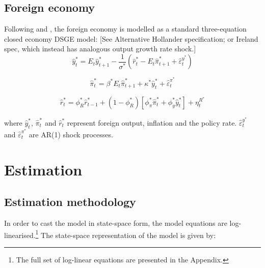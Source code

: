 \documentclass[a4paper,11pt]{article}
\numberwithin{equation}{section}
\begin{document}
%	
	
	
	\subsection{Foreign economy}
	
	Following \cite{steinbach2014} and , the foreign economy is modelled as a standard three-equation closed economy DSGE model:
	{[\color{red}See Alternative Hollander specification; or Ireland spec, which instead has analogous output growth rate shock.]}
	\begin{equation}
	\hat{y}_t^*=E_t\hat{y}_{t+1}^*-\frac{1}{\sigma^*}\left(\hat{r}_t^*-E_t\hat{\pi}_{t+1}^*+\hat{\varepsilon}_t^{y^*}\right)
	\end{equation}
	
	\begin{equation}
	\hat{\pi}_{t}^*=\beta^* E_t\hat{\pi}_{t+1}^*+\kappa^*\hat{y}_{t}^*+\hat{\varepsilon}_t^{\pi^*}
	\end{equation}
	
	\begin{equation}
	\hat{r}_t^*=\phi_R^*\hat{r}_{t-1}^*+(1-\phi_R^*)\left[\phi_{\pi}^*\hat{\pi}_{t}^*+\phi_{y}^*\hat{y}_t^*\right]+\eta_t^{R^*}
	\end{equation}
	
	where $\hat{y}_t^*$, $\hat{\pi}_{t}^*$ and $\hat{r}_t^*$ represent foreign output, inflation and the policy rate. $\hat{\varepsilon}_t^{y^*}$ and $\hat{\varepsilon}_t^{\pi^*}$ are AR(1) shock processes.
	
	\section{Estimation} \label{estimation}
	\subsection{Estimation methodology}
	
	In order to cast the model in state-space form, the model equations are log-linearised.\footnote{The full set of log-linear equations are presented in the Appendix.} The state-space representation of the model is given by:
	
\end{document}
